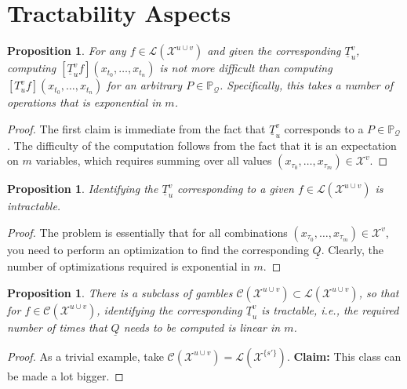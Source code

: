 \documentclass[a4paper,reqno]{amsart}
\newtheorem{proposition}[theorem]{Proposition}
\newcommand{\states}{\mathcal{X}}
\newcommand{\lt}{\underline{T}}
\newcommand{\gambles}{\mathcal{L}}
\newcommand{\lrate}{\underline{Q}}
\newcommand{\coloneqq}{:\!=}
\begin{document}
\section{Tractability Aspects}

\begin{proposition}
For any $f\in\gambles(\states^{u\cup v})$ and given the corresponding $\lt_u^v$, computing $\left[\lt_u^v f\right](x_{t_0},\ldots,x_{t_n})$ is not more difficult than computing $\left[T_u^v f\right](x_{t_0},\ldots,x_{t_n})$ for an arbitrary $P\in\mathbb{P}_{\mathcal{Q}}$. Specifically, this takes a number of operations that is exponential in $m$.
\end{proposition}
\begin{proof}
The first claim is immediate from the fact that $\lt_u^v$ corresponds to a $P\in\mathbb{P}_\mathcal{Q}$. The difficulty of the computation follows from the fact that it is an expectation on $m$ variables, which requires summing over all values $(x_{\tau_0},\ldots,x_{\tau_m})\in\states^v$.
\end{proof}

\begin{proposition}
Identifying the $\lt_u^v$ corresponding to a given $f\in\gambles(\states^{u\cup v})$ is intractable.
\end{proposition}
\begin{proof}
The problem is essentially that for all combinations $(x_{\tau_0},\ldots,x_{\tau_m})\in\states^v$, you need to perform an optimization to find the corresponding $\lrate$. Clearly, the number of optimizations required is exponential in $m$.
\end{proof}

\begin{proposition}
There is a subclass of gambles $\mathcal{C}(\states^{u\cup v})\subset\gambles(\states^{u\cup v})$, so that for $f\in\mathcal{C}(\states^{u\cup v})$, identifying the corresponding $\lt_u^v$ is tractable, i.e., the required number of times that $\lrate$ needs to be computed is linear in $m$.
\end{proposition}
\begin{proof}
As a trivial example, take $\mathcal{C}(\states^{u\cup v}) = \gambles(\states^{\{s'\}})$. {\bf Claim: } This class can be made a lot bigger.
\end{proof}



 
%
\end{document}
